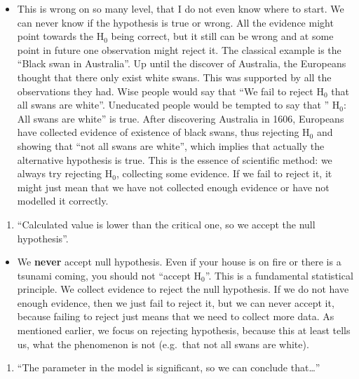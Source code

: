 \documentclass[
]{book}
\providecommand{\tightlist}{%
  \setlength{\itemsep}{0pt}\setlength{\parskip}{0pt}}
\theoremstyle{definition}
\theoremstyle{definition}
\theoremstyle{definition}
\theoremstyle{definition}
\theoremstyle{remark}
\begin{document}
\begin{itemize}
\tightlist
\item
  This is wrong on so many level, that I do not even know where to start. We can never know if the hypothesis is true or wrong. All the evidence might point towards the \(\mathrm{H}_0\) being correct, but it still can be wrong and at some point in future one observation might reject it. The classical example is the ``Black swan in Australia''. Up until the discover of Australia, the Europeans thought that there only exist white swans. This was supported by all the observations they had. Wise people would say that ``We fail to reject \(\mathrm{H}_0\) that all swans are white''. Uneducated people would be tempted to say that '' \(\mathrm{H}_0\): All swans are white'' is true. After discovering Australia in 1606, Europeans have collected evidence of existence of black swans, thus rejecting \(\mathrm{H}_0\) and showing that ``not all swans are white'', which implies that actually the alternative hypothesis is true. This is the essence of scientific method: we always try rejecting \(\mathrm{H}_0\), collecting some evidence. If we fail to reject it, it might just mean that we have not collected enough evidence or have not modelled it correctly.
\end{itemize}

\begin{enumerate}
\def\labelenumi{\arabic{enumi}.}
\setcounter{enumi}{1}
\tightlist
\item
  ``Calculated value is lower than the critical one, so we accept the null hypothesis''.
\end{enumerate}

\begin{itemize}
\tightlist
\item
  We \textbf{never} accept null hypothesis. Even if your house is on fire or there is a tsunami coming, you should not ``accept \(\mathrm{H}_0\)''. This is a fundamental statistical principle. We collect evidence to reject the null hypothesis. If we do not have enough evidence, then we just fail to reject it, but we can never accept it, because failing to reject just means that we need to collect more data. As mentioned earlier, we focus on rejecting hypothesis, because this at least tells us, what the phenomenon is not (e.g.~that not all swans are white).
\end{itemize}

\begin{enumerate}
\def\labelenumi{\arabic{enumi}.}
\setcounter{enumi}{2}
\tightlist
\item
  ``The parameter in the model is significant, so we can conclude that\ldots{}''
\end{enumerate}
\end{document}
